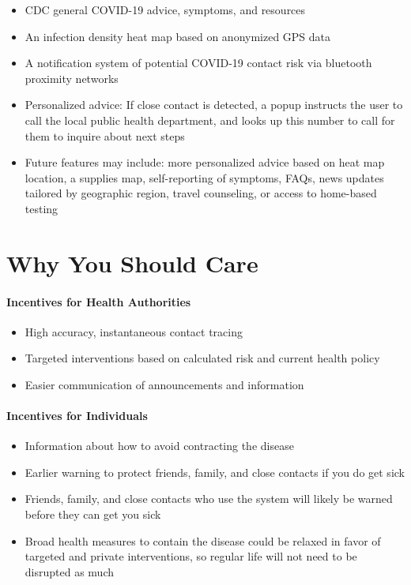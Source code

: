 \documentclass[11pt]{article}
\begin{document}
\begin{itemize}
  \item CDC general COVID-19 advice, symptoms, and resources
  \item An infection density heat map based on anonymized GPS data
  \item A notification system of potential COVID-19 contact risk via bluetooth proximity networks
  \item Personalized advice: If close contact is detected, a popup instructs the user to call the local public health department, and looks up this number to call for them to inquire about next steps
  \item Future features may include: more personalized advice based on heat map location, a supplies map, self-reporting of symptoms, FAQs, news updates tailored by geographic region, travel counseling, or access to home-based testing
\end{itemize}



\section{Why You Should Care}

\paragraph{Incentives for Health Authorities}
\begin{itemize}
  \item High accuracy, instantaneous contact tracing
  \item Targeted interventions based on calculated risk and current health policy
  \item Easier communication of announcements and information
\end{itemize}


\paragraph{Incentives for Individuals}
\begin{itemize}
  \item Information about how to avoid contracting the disease
  \item Earlier warning to protect friends, family, and close contacts if you do get sick
  \item Friends, family, and close contacts who use the system will likely be warned before they can get you sick
  \item Broad health measures to contain the disease could be relaxed in favor of targeted and private interventions, so regular life will not need to be disrupted as much
\end{itemize}
\end{document}
